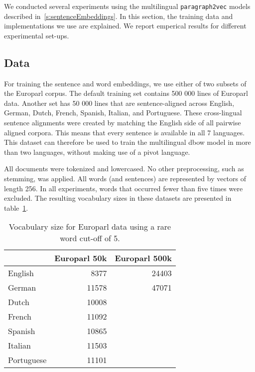
We conducted several experiments using the multilingual \texttt{paragraph2vec} models described in~\ref{s:sentenceEmbeddings}. In this section, the training data and implementations we use are explained. We report emperical results for different experimental set-ups.



\subsection{Data}

For training the sentence and word embeddings, we use either of two subsets of the Europarl corpus.
The default training set contains 500 000 lines of Europarl data.
Another set has 50 000 lines that are sentence-aligned across English, German, Dutch, French, Spanish, Italian, and Portuguese.
These cross-lingual sentence alignments were created by matching the English side of all pairwise aligned corpora.
This means that every sentence is available in all 7 languages. This dataset can therefore be used to train the multilingual dbow model in more than two languages, without making use of a pivot language.

All documents were tokenized and lowercased. No other preprocessing, such as stemming, was applied.
All words (and sentences) are represented by vectors of length 256.
In all experiments, words that occurred fewer than five times were excluded.
The resulting vocabulary sizes in these datasets are presented  in table~\ref{t:vocabularies}.

\begin{table}
\center
\begin{tabular}{l| r r}
		&Europarl 50k 	&Europarl 500k\\\hline
English	&8377			&24403	\\	
German	&11578		&47071	\\
Dutch		&10008				\\
French	&11092				\\	
Spanish	&10865				\\
Italian		&11503				\\
Portuguese	&11101				\\
\end{tabular}
\caption{Vocabulary size for Europarl data using a rare word cut-off of 5.}
\label{t:vocabularies}
\end{table}


